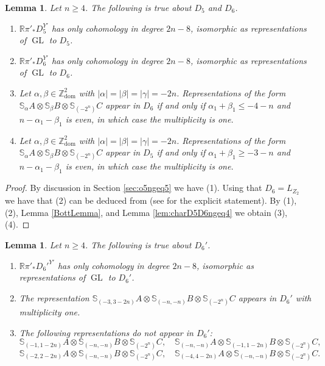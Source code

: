 \documentclass[11pt,reqno]{amsart}
\newcommand{\oo}{\otimes}
\newcommand{\bS}{\mathbb{S}}
\newcommand{\GL}{\operatorname{GL}}
\newcommand{\dom}{\operatorname{dom}}
\newtheorem{lemma}[theorem]{Lemma}
\numberwithin{equation}{section}
\begin{document}
\begin{lemma}\label{lem:pushD5}
Let $n\geq 4$. The following is true about $D_5$ and $D_6$.
\begin{enumerate}
\item $\mathbb{R}\pi'_{\ast}D_5^{Y'}$ has only cohomology in degree $2n-8$, isomorphic as representations of $\GL$ to $D_5$.
\item  $\mathbb{R}\pi'_{\ast}D_6^{Y'}$ has only cohomology in degree $2n-8$, isomorphic as representations of $\GL$ to $D_6$.


\item Let $\alpha,\beta \in \mathbb{Z}^2_{\dom}$ with $|\alpha|=|\beta|=|\gamma|=-2n$. Representations of the form $\bS_{\alpha}A\oo \bS_{\beta}B\oo \bS_{(-2^n)}C$	appear in $D_6$ if and only if $\alpha_1+\beta_1\leq -4-n$ and $n-\alpha_1-\beta_1$ is even, in which case the multiplicity is one.
\item Let $\alpha,\beta \in \mathbb{Z}^2_{\dom}$ with $|\alpha|=|\beta|=|\gamma|=-2n$. Representations of the form $\bS_{\alpha}A\oo \bS_{\beta}B\oo \bS_{(-2^n)}C$	appear in $D_5$ if and only if $\alpha_1+\beta_1\geq -3-n$ and $n-\alpha_1-\beta_1$ is even, in which case the multiplicity is one.\end{enumerate}
		
\end{lemma}

\begin{proof}
By discussion in Section \ref{sec:o5ngeq5} we have (1). Using that $D_6=L_{Z_2}$ we have that (2) can be deduced from \cite{raicu2016characters, raicuWeymanLocal} (see \cite[Lemma 3.4]{socledegs} for the explicit statement). By (1), (2), Lemma \ref{BottLemma}, and Lemma \ref{lem:charD5D6ngeq4} we obtain (3),(4). \end{proof}

\begin{lemma}\label{lem:pushD6prime}
Let $n\geq 4$. The following is true about $D_6'$.
\begin{enumerate}
\item $\mathbb{R}\pi'_{\ast}D_6'^{Y'}$ has only cohomology in degree $2n-8$, isomorphic as representations of $\GL$ to $D_6'$. 

\item The representation $\bS_{(-3,3-2n)}A\oo \bS_{(-n,-n)}B\oo \bS_{(-2^n)}C$ appears in $D_6'$ with multiplicity one.	
\item The following representations do not appear in $D_6'$:
$$
\bS_{(-1,1-2n)}A\oo \bS_{(-n,-n)}B\oo \bS_{(-2^n)}C,\quad \bS_{(-n,-n)}A\oo \bS_{(-1,1-2n)}B\oo \bS_{(-2^n)}C,
$$ 
$$
\bS_{(-2,2-2n)}A\oo \bS_{(-n,-n)}B\oo \bS_{(-2^n)}C,\quad \bS_{(-4,4-2n)}A\oo \bS_{(-n,-n)}B\oo \bS_{(-2^n)}C.
$$

\end{enumerate}

		
\end{lemma}
\end{document}
